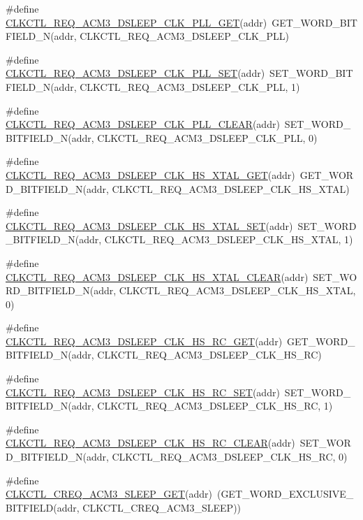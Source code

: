 \begin{DoxyCompactItemize}
\item 
\#define \hyperlink{a00544_ad9ef1ea15dcce2d0a95c3a1a211ec1fa}{CLKCTL\_\-REQ\_\-ACM3\_\-DSLEEP\_\-CLK\_\-PLL\_\-GET}(addr)~GET\_\-WORD\_\-BITFIELD\_\-N(addr, CLKCTL\_\-REQ\_\-ACM3\_\-DSLEEP\_\-CLK\_\-PLL)
\item 
\#define \hyperlink{a00544_a2fe1b01f00af3391f37cfffda518b7d9}{CLKCTL\_\-REQ\_\-ACM3\_\-DSLEEP\_\-CLK\_\-PLL\_\-SET}(addr)~SET\_\-WORD\_\-BITFIELD\_\-N(addr, CLKCTL\_\-REQ\_\-ACM3\_\-DSLEEP\_\-CLK\_\-PLL, 1)
\item 
\#define \hyperlink{a00544_a6c8d9e3bbd2887d20ac2ba1f0c97262c}{CLKCTL\_\-REQ\_\-ACM3\_\-DSLEEP\_\-CLK\_\-PLL\_\-CLEAR}(addr)~SET\_\-WORD\_\-BITFIELD\_\-N(addr, CLKCTL\_\-REQ\_\-ACM3\_\-DSLEEP\_\-CLK\_\-PLL, 0)
\item 
\#define \hyperlink{a00544_a28abd80d7f710559da884bbe0ac65371}{CLKCTL\_\-REQ\_\-ACM3\_\-DSLEEP\_\-CLK\_\-HS\_\-XTAL\_\-GET}(addr)~GET\_\-WORD\_\-BITFIELD\_\-N(addr, CLKCTL\_\-REQ\_\-ACM3\_\-DSLEEP\_\-CLK\_\-HS\_\-XTAL)
\item 
\#define \hyperlink{a00544_aafa95a926c67e32c624011f6e542ce51}{CLKCTL\_\-REQ\_\-ACM3\_\-DSLEEP\_\-CLK\_\-HS\_\-XTAL\_\-SET}(addr)~SET\_\-WORD\_\-BITFIELD\_\-N(addr, CLKCTL\_\-REQ\_\-ACM3\_\-DSLEEP\_\-CLK\_\-HS\_\-XTAL, 1)
\item 
\#define \hyperlink{a00544_a7ce3047ac060a70de6ec44929bef7d76}{CLKCTL\_\-REQ\_\-ACM3\_\-DSLEEP\_\-CLK\_\-HS\_\-XTAL\_\-CLEAR}(addr)~SET\_\-WORD\_\-BITFIELD\_\-N(addr, CLKCTL\_\-REQ\_\-ACM3\_\-DSLEEP\_\-CLK\_\-HS\_\-XTAL, 0)
\item 
\#define \hyperlink{a00544_afd66c06bd4185c5a370ca6a1aad0c8e3}{CLKCTL\_\-REQ\_\-ACM3\_\-DSLEEP\_\-CLK\_\-HS\_\-RC\_\-GET}(addr)~GET\_\-WORD\_\-BITFIELD\_\-N(addr, CLKCTL\_\-REQ\_\-ACM3\_\-DSLEEP\_\-CLK\_\-HS\_\-RC)
\item 
\#define \hyperlink{a00544_a8a56d7522733f903d291ca55dc6352cb}{CLKCTL\_\-REQ\_\-ACM3\_\-DSLEEP\_\-CLK\_\-HS\_\-RC\_\-SET}(addr)~SET\_\-WORD\_\-BITFIELD\_\-N(addr, CLKCTL\_\-REQ\_\-ACM3\_\-DSLEEP\_\-CLK\_\-HS\_\-RC, 1)
\item 
\#define \hyperlink{a00544_a4002f71fe880386dc04efe808b7e75b2}{CLKCTL\_\-REQ\_\-ACM3\_\-DSLEEP\_\-CLK\_\-HS\_\-RC\_\-CLEAR}(addr)~SET\_\-WORD\_\-BITFIELD\_\-N(addr, CLKCTL\_\-REQ\_\-ACM3\_\-DSLEEP\_\-CLK\_\-HS\_\-RC, 0)
\item 
\#define \hyperlink{a00544_a6f858ac02bb67b221ed4b3d3150eb112}{CLKCTL\_\-CREQ\_\-ACM3\_\-SLEEP\_\-GET}(addr)~(GET\_\-WORD\_\-EXCLUSIVE\_\-BITFIELD(addr, CLKCTL\_\-CREQ\_\-ACM3\_\-SLEEP))
\item 

\end{DoxyCompactItemize}
